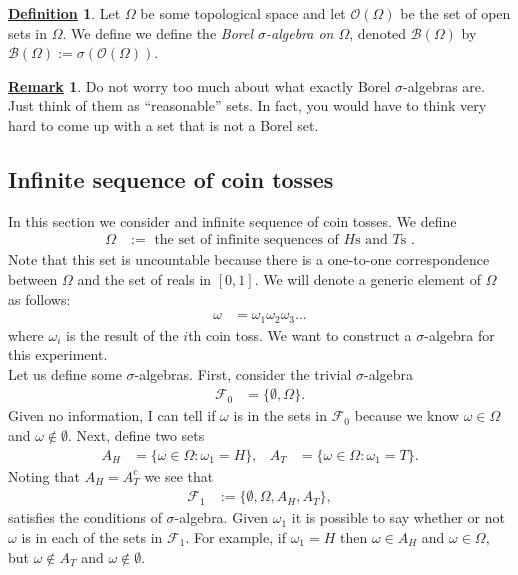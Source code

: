 \documentclass[12pt]{book}
\numberwithin{equation}{chapter}
\theoremstyle{plain}
\numberwithin{theorem}{section}
\theoremstyle{definition}
\newtheorem{definition}[theorem]{\underline{Definition}}
\newtheorem{remark}[theorem]{\underline{Remark}}
\numberwithin{exercise}{chapter}
\newcommand{\<}{\langle}
\renewcommand{\>}{\rangle}
\renewcommand{\(}{\left(}
\renewcommand{\)}{\right)}
\renewcommand{\[}{\left[}
\renewcommand{\]}{\right]}
\newcommand\Bc{\mathscr{B}}
\newcommand\Fc{\mathscr{F}}
\newcommand\Oc{\mathscr{O}}
\newcommand\om{\omega}
\newcommand\Om{\Omega}
\newcommand\sig{\sigma}
\newcommand{\blu}[1]{\textcolor{blue}{#1}}
\begin{document}
\begin{definition}
Let $\Om$ be some topological space and let $\Oc(\Om)$ be the set of open sets in $\Om$.  We define we define the \emph{Borel $\sig$-algebra on $\Om$}, denoted $\Bc(\Om)$ by $\Bc(\Om) := \sig(\Oc(\Om))$.
\end{definition}

\begin{remark}
Do not worry too much about what exactly Borel $\sig$-algebras are.  Just think of them as ``reasonable'' sets.  In fact, you would have to think very hard to come up with a set that is not a Borel set.
\end{remark}


\subsection{Infinite sequence of coin tosses}
\label{sec:coin-toss}
In this section we consider and infinite sequence of coin tosses.  We define
\begin{align}
\Om
	&:=	\text{ the set of infinite sequences of  $H$s and $T$s } .
\end{align}
Note that this set is uncountable because there is a one-to-one correspondence between $\Om$ and the set of reals in $[0,1]$.  We will denote a generic element of $\Om$ as follows:
\begin{align}
\om
	&=	\om_1 \om_2 \om_3 \ldots
\end{align}
where $\om_i$ is the result of the $i$th coin toss.  We want to construct a $\sig$-algebra for this experiment.
\\[0.5em]
Let us define some $\sig$-algebras.  First, consider the trivial $\sig$-algebra
\begin{align}
\Fc_0
	&=	\{ \emptyset, \Om \} .
\end{align}
Given no information, I can tell if $\om$ is in the sets in $\Fc_0$ because we know $\om \in \Om$ and $\om \notin \emptyset$.
Next, define two sets
\begin{align}
A_H
	&= \{ \om \in \Om : \om_1 = H \} , &
A_T
	&= \{ \om \in \Om : \om_1 = T \} .
\end{align}
Noting that $A_H = A_T^c$ we see that
\begin{align}
\Fc_1
	&:=	\{ \emptyset, \Om, A_H , A_T \} ,
\end{align}
satisfies the conditions of $\sig$-algebra.  Given $\om_1$ it is possible to say whether or not $\om$ is in each of the sets in $\Fc_1$.  For example, if $\om_1 = H$ then $\om \in A_H$ and $\om \in \Om$, but $\om \notin A_T$ and $\om \notin \emptyset$.
\end{document}
